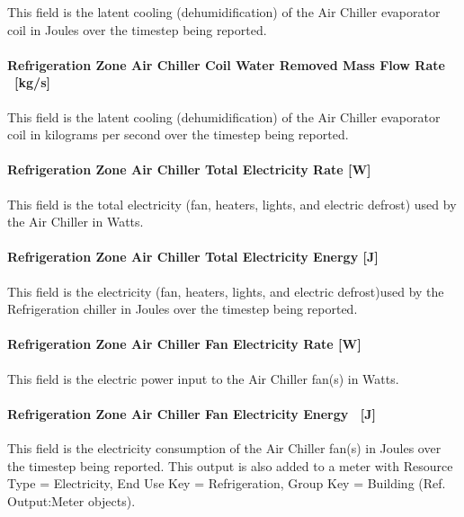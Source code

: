 This field is the latent cooling (dehumidification) of the Air Chiller evaporator coil in Joules over the timestep being reported.

\paragraph{Refrigeration Zone Air Chiller Coil Water Removed Mass Flow Rate ~{[}kg/s{]}}\label{refrigeration-zone-air-chiller-coil-water-removed-mass-flow-rate-kgs-1}

This field is the latent cooling (dehumidification) of the Air Chiller evaporator coil in kilograms per second over the timestep being reported.

\paragraph{Refrigeration Zone Air Chiller Total Electricity Rate {[}W{]}}\label{refrigeration-zone-air-chiller-total-electric-power-w}

This field is the total electricity (fan, heaters, lights, and electric defrost) used by the Air Chiller in Watts.

\paragraph{Refrigeration Zone Air Chiller Total Electricity Energy {[}J{]}}\label{refrigeration-zone-air-chiller-total-electric-energy-j}

This field is the electricity (fan, heaters, lights, and electric defrost)used by the Refrigeration chiller in Joules over the timestep being reported.

\paragraph{Refrigeration Zone Air Chiller Fan Electricity Rate {[}W{]}}\label{refrigeration-zone-air-chiller-fan-electric-power-w}

This field is the electric power input to the Air Chiller fan(s) in Watts.

\paragraph{Refrigeration Zone Air Chiller Fan Electricity Energy ~{[}J{]}}\label{refrigeration-zone-air-chiller-fan-electric-energy-j}

This field is the electricity consumption of the Air Chiller fan(s) in Joules over the timestep being reported. This output is also added to a meter with Resource Type = Electricity, End Use Key = Refrigeration, Group Key = Building (Ref. Output:Meter objects).

